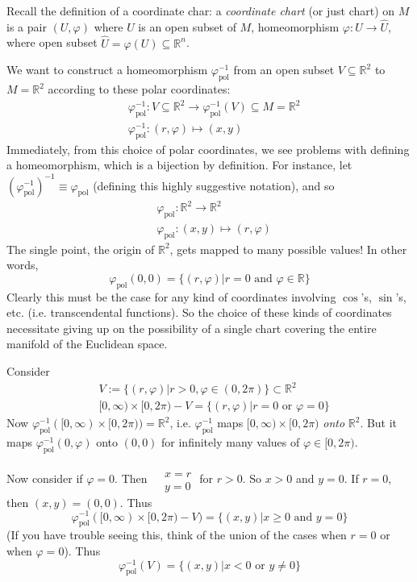 \documentclass[10pt]{amsart}
\begin{document}
\begin{multicols*}{2}
Recall the definition of a coordinate char: a \emph{coordinate chart} (or just chart) on $M$ is a pair $(U, \varphi)$ where $U$ is an open subset of $M$, homeomorphism $\varphi : U \to \widehat{U}$, where open subset $\widehat{U} = \varphi(U) \subseteq \mathbb{R}^n$.

We want to construct a homeomorphism $\varphi^{-1}_{\text{pol}}$ from an open subset $V \subseteq \mathbb{R}^2$ to $M = \mathbb{R}^2$ according to these polar coordinates:
\[
\begin{aligned}
	& \varphi_{\text{pol}}^{-1}: V \subseteq \mathbb{R}^2 \to \varphi_{\text{pol}}^{-1}(V) \subseteq M = \mathbb{R}^2 \\ 
	& \varphi^{-1}_{\text{pol}}:(r,\varphi) \mapsto (x,y)
\end{aligned}
\]
Immediately, from this choice of polar coordinates, we see problems with defining a homeomorphism, which is a bijection by definition.  For instance, let $(\varphi_{\text{pol}}^{-1})^{-1} \equiv \varphi_{\text{pol}}$ (defining this highly suggestive notation), and so 
\[
\begin{aligned}
	& \varphi_{\text{pol}}:\mathbb{R}^2 \to \mathbb{R}^2 \\ 
	& \varphi_{\text{pol}}:(x,y) \mapsto (r,\varphi)
\end{aligned}
\]
The single point, the origin of $\mathbb{R}^2$, gets mapped to many possible values! In other words,
\[
\varphi_{\text{pol}}(0,0) = \lbrace (r,\varphi) | r=0 \text{ and } \varphi \in \mathbb{R} \rbrace
\]
Clearly this must be the case for any kind of coordinates involving $\cos$'s, $\sin$'s, etc. (i.e. transcendental functions).  So the choice of these kinds of coordinates necessitate giving up on the possibility of a single chart covering the entire manifold of the Euclidean space.  

Consider 
\[
\begin{aligned}
	& V := \lbrace (r,\varphi) | r>0, \varphi \in (0,2\pi) \rbrace \subset \mathbb{R}^2 \\ 
	& [0,\infty) \times [0,2\pi ) - V = \lbrace (r,\varphi) | r = 0 \text{ or } \varphi = 0 \rbrace
\end{aligned}
\]
Now $\varphi_{\text{pol}}^{-1}( [0,\infty) \times [0,2\pi)) = \mathbb{R}^2$, i.e. $\varphi_{\text{pol}}^{-1}$ maps $[0,\infty) \times [0,2\pi)$ \emph{onto} $\mathbb{R}^2$. But it maps $\varphi^{-1}_{\text{pol}}(0, \varphi)$ onto $(0, 0)$ for infinitely many values of $\varphi \in [0, 2\pi)$.

Now consider if $\varphi=0$.  Then $\begin{aligned} & \quad \\
	& x = r \\ 
	& y = 0 \end{aligned}$ for $r>0$.  So $x>0$ and $y=0$.  If $r=0$, then $(x,y)=(0,0)$.  Thus
\[
\varphi_{\text{pol}}^{-1}( [0,\infty) \times [0,2\pi)-V) = \lbrace (x,y) | x\geq 0 \text{ and } y=0 \rbrace
\]
(If you have trouble seeing this, think of the union of the cases when $r=0$ or when $\varphi=0$).  Thus
\[
\varphi^{-1}_{\text{pol}}(V) = \lbrace (x,y) | x<0 \text{ or } y \neq 0 \rbrace
\]


\end{multicols*}
\end{document}
